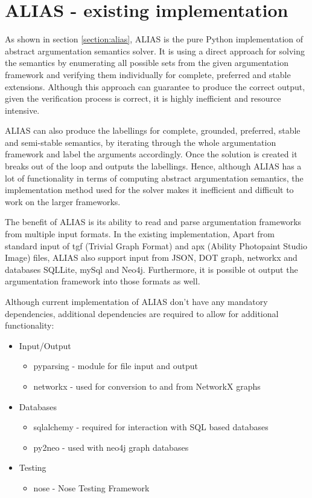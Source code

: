 \section{ALIAS - existing implementation}
As shown in section \ref{section:alias}, ALIAS \citep{alias} is the pure Python implementation of abstract argumentation semantics solver. It is using a direct approach for solving the semantics by enumerating all possible sets from the given argumentation framework and verifying them individually for complete, preferred and stable extensions. Although this approach can guarantee to produce the correct output, given the verification process is correct, it is highly inefficient and resource intensive. 

ALIAS can also produce the labellings for complete, grounded, preferred, stable and semi-stable semantics, by iterating through the whole argumentation framework and label the arguments accordingly. Once the solution is created it breaks out of the loop and outputs the labellings. Hence, although ALIAS has a lot of functionality in terms of computing abstract argumentation semantics, the implementation method used for the solver makes it inefficient and difficult to work on the larger frameworks. 

The benefit of ALIAS is its ability to read and parse argumentation frameworks from multiple input formats. In the existing implementation, Apart from standard input of tgf (Trivial Graph Format) and apx (Ability Photopaint Studio Image) files, ALIAS also support input from JSON, DOT graph, networkx and databases SQLLite, mySql and Neo4j. Furthermore, it is possible ot output the argumentation framework into those formats as well.

Although current implementation of ALIAS don't have any mandatory dependencies, additional dependencies are required to allow for additional functionality:
\begin{itemize}
	\item Input/Output
	\begin{itemize}
		\item pyparsing - module for file input and output
		\item networkx - used for conversion to and from NetworkX graphs 
	\end{itemize}
	\item Databases
	\begin{itemize}
		\item sqlalchemy - required for interaction with SQL based databases
		\item py2neo - used with neo4j graph databases
	\end{itemize}
	\item Testing
	\begin{itemize}
		\item nose - Nose Testing Framework
	\end{itemize}
\end{itemize}

